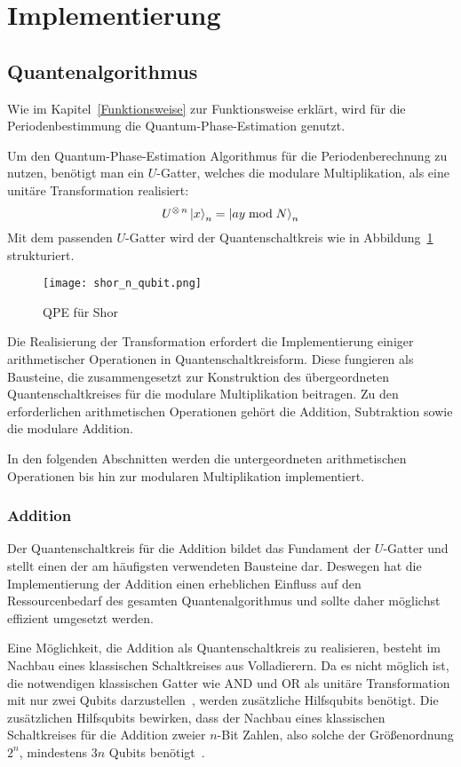 \section{Implementierung} \label{sec:Implementierung}

\subsection{Quantenalgorithmus}
Wie im Kapitel~\ref{Funktionsweise} zur Funktionsweise erklärt,
wird für die Periodenbestimmung die Quantum-Phase-Estimation genutzt.

Um den Quantum-Phase-Estimation Algorithmus für die Periodenberechnung zu nutzen,
benötigt man ein \(U\)-Gatter, 
welches die modulare Multiplikation, 
als eine unitäre Transformation realisiert:
\[U^{\operatorname{\otimes} n}\ket{x}_n=\ket{a y \bmod N}_n\]
Mit dem passenden \(U\)-Gatter wird der Quantenschaltkreis wie in Abbildung~\ref{fig:shor_n_qubit} strukturiert.
\begin{figure}
    \centering
    \texttt{[image: shor\_n\_qubit.png]}
    \caption{QPE für Shor~\cite{anonymousket}}
    \label{fig:shor_n_qubit}
  \end{figure}

Die Realisierung der Transformation erfordert die Implementierung einiger arithmetischer Operationen in Quantenschaltkreisform. 
Diese fungieren als Bausteine, die zusammengesetzt zur Konstruktion des übergeordneten Quantenschaltkreises für die modulare Multiplikation beitragen. 
Zu den erforderlichen arithmetischen Operationen gehört die Addition, Subtraktion sowie die modulare Addition.

In den folgenden Abschnitten werden die untergeordneten arithmetischen Operationen bis hin zur modularen Multiplikation implementiert.

\subsubsection{Addition} \label{sec:QuantumAdder}
Der Quantenschaltkreis für die Addition bildet das Fundament der \(U\)-Gatter und 
stellt einen der am häufigsten verwendeten Bausteine dar. 
Deswegen hat die Implementierung der Addition einen erheblichen Einfluss auf den Ressourcenbedarf des gesamten Quantenalgorithmus
und sollte daher möglichst effizient umgesetzt werden.

Eine Möglichkeit, die Addition als Quantenschaltkreis zu realisieren, 
besteht im Nachbau eines klassischen Schaltkreises aus Volladierern. 
Da es nicht möglich ist, 
die notwendigen klassischen Gatter wie AND und OR als unitäre Transformation mit nur zwei Qubits darzustellen~\cite{Hoever2023QC},
werden zusätzliche Hilfsqubits benötigt.
Die zusätzlichen Hilfsqubits bewirken, dass der Nachbau eines klassischen Schaltkreises für die Addition zweier \(n\)-Bit Zahlen, 
also solche der Größenordnung \(2^n\), mindestens \(3n\) Qubits benötigt~\cite{zalka1998fast}.

